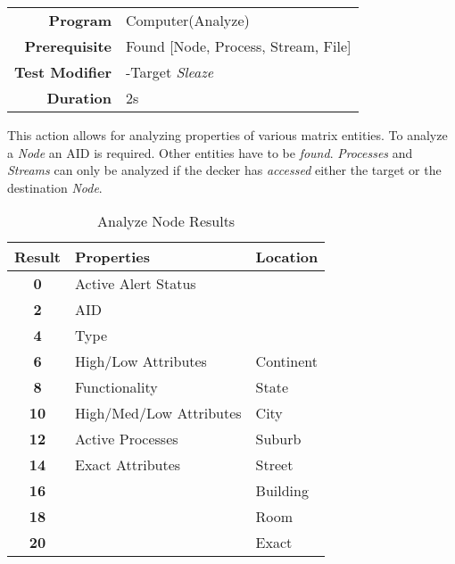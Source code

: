\begin{tabular}{rl}
    \textbf{Program}       & Computer(Analyze)                   \\
    \textbf{Prerequisite}  & Found [Node, Process, Stream, File] \\
    \textbf{Test Modifier} & -Target \emph{Sleaze}               \\
    \textbf{Duration}      & 2s                                  \\
\end{tabular}

\hfill

This action allows for analyzing properties of various matrix entities. To analyze a \emph{Node}
an AID is required. Other entities have to be \emph{found}. \emph{Processes} and \emph{Streams}
can only be analyzed if the decker has \emph{accessed} either the target or the destination
\emph{Node}.

\begin{table}[htb]
    \caption[Analyze Node Results]{Analyze Node Results}
    \label{tab:analyze results}
    \centering
    \begin{tabular}{cll}
        \toprule
        \textbf{Result} & \textbf{Properties}     & \textbf{Location} \\
        \midrule
        \textbf{0}      & Active Alert Status     &                   \\
        \textbf{2}      & AID                     &                   \\
        \textbf{4}      & Type                    &                   \\
        \textbf{6}      & High/Low Attributes     & Continent         \\
        \textbf{8}      & Functionality           & State             \\
        \textbf{10}     & High/Med/Low Attributes & City              \\
        \textbf{12}     & Active Processes        & Suburb            \\
        \textbf{14}     & Exact Attributes        & Street            \\
        \textbf{16}     &                         & Building          \\
        \textbf{18}     &                         & Room              \\
        \textbf{20}     &                         & Exact             \\
        \bottomrule
    \end{tabular}
\end{table}


